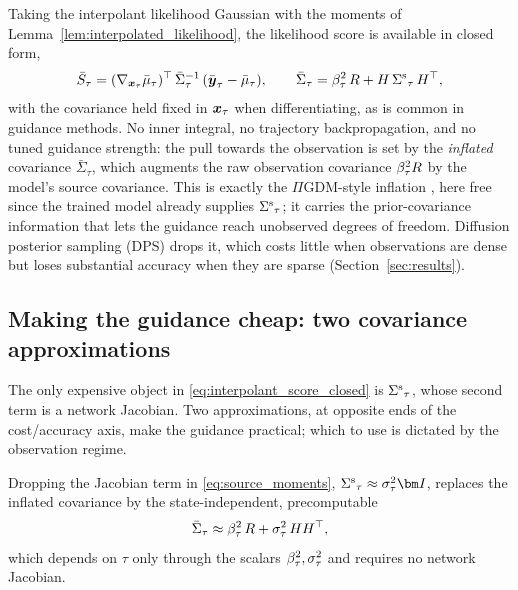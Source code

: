Taking the interpolant likelihood Gaussian with the moments of Lemma~\ref{lem:interpolated_likelihood}, the likelihood score is available in closed form,
\begin{align}\label{eq:interpolant_score_closed}
    \bar{S}_\tau
    = (\nabla_{\boldsymbol{x}_\tau}\bar{\mu}_\tau)^\top\,\bar{\Sigma}_\tau^{-1}\,(\bar{\boldsymbol{y}}_\tau - \bar{\mu}_\tau),
    \qquad
    \bar{\Sigma}_\tau = \beta_\tau^2\,R + H\,{\Sigma^{\mathrm{s}}}_\tau\,H^\top,
\end{align}
with the covariance held fixed in $\boldsymbol{x}_\tau$ when differentiating, as is common in guidance methods. No inner integral, no trajectory backpropagation, and no tuned guidance strength: the pull towards the observation is set by the \emph{inflated} covariance $\bar\Sigma_\tau$, which augments the raw observation covariance $\beta_\tau^2R$ by the model's source covariance. This is exactly the $\Pi$GDM-style inflation \cite{song_pseudoinverse_2023}, here free since the trained model already supplies ${\Sigma^{\mathrm{s}}}_\tau$; it carries the prior-covariance information that lets the guidance reach unobserved degrees of freedom. Diffusion posterior sampling (DPS) \cite{chung_diffusion_2023, chung_improving_2024} drops it, which costs little when observations are dense but loses substantial accuracy when they are sparse (Section~\ref{sec:results}).

\subsection{Making the guidance cheap: two covariance approximations}
\label{subsec:approximations}\label{subsec:covariance_approximation}

The only expensive object in \eqref{eq:interpolant_score_closed} is ${\Sigma^{\mathrm{s}}}_\tau$, whose second term is a network Jacobian. Two approximations, at opposite ends of the cost/accuracy axis, make the guidance practical; which to use is dictated by the observation regime.

\begin{corollary}\label{cor:cheap_drift}
Dropping the Jacobian term in \eqref{eq:source_moments}, $\srccov_\tau\approx\sigpath_\tau^2\bI$, replaces the inflated covariance by the state-independent, precomputable
\begin{align}\label{eq:cov_cheap}
    \bar{\Sigma}_\tau \approx \beta_\tau^2\,R + \sigma_\tau^2\,HH^\top,
\end{align}
which depends on $\tau$ only through the scalars $\beta_\tau^2,\sigma_\tau^2$ and requires no network Jacobian.
\end{corollary}

